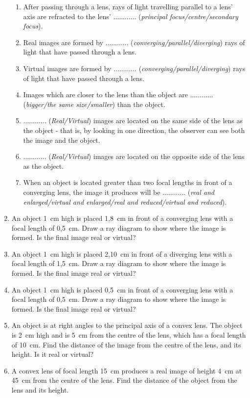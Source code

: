 \begin{eocexercises}{}
\begin{enumerate}
{\begin{enumerate}
\item After passing through a lens, rays of light travelling parallel to a lens' axis are refracted to the lens' $\ldots\ldots\ldots\ldots$ (\textit{principal focus/centre/secondary focus}).
\item Real images are formed by $\ldots\ldots\ldots\ldots$ (\textit{converging/parallel/diverging}) rays of light that have passed through a lens.
\item Virtual images are formed by $\ldots\ldots\ldots\ldots$ (\textit{converging/parallel/diverging}) rays of light that have passed through a lens.
\item Images which are closer to the lens than the object are $\ldots\ldots\ldots\ldots$ (\textit{bigger/the same size/smaller}) than the object.
\item $\ldots\ldots\ldots\ldots$ (\textit{Real/Virtual}) images are located on the same side of the lens as the object - that is, by looking in one direction, the observer can see both the image and the object.
\item $\ldots\ldots\ldots\ldots$ (\textit{Real/Virtual}) images are located on the opposite side of the lens as the object.
\item When an object is located greater than two focal lengths in front of a converging lens, the image it produces will be $\ldots\ldots\ldots\ldots$ (\textit{real and enlarged/virtual and enlarged/real and reduced/virtual and reduced}).
\end{enumerate}}
\item An object 1~cm high is placed 1,8~cm in front of a converging lens with a focal length of 0,5~cm. Draw a ray diagram to show where the image is formed. Is the final image real or virtual?
\item An object 1~cm high is placed 2,10~cm in front of a diverging lens with a focal length of 1,5~cm. Draw a ray diagram to show where the image is formed. Is the final image real or virtual?
\item An object 1~cm high is placed 0,5~cm in front of a converging lens with a focal length of 0,5~cm. Draw a ray diagram to show where the image is formed. Is the final image real or virtual?
\item An object is at right angles to the principal axis of a convex lens. The object is 2~cm high and is 5~cm from the centre of the lens, which has a focal length of 10~cm. Find the distance of the image from the centre of the lens, and its height. Is it real or virtual?
\item A convex lens of focal length 15~cm produces a real image of height 4~cm at 45~cm from the centre of the lens. Find the distance of the object from the lens and its height.

\end{enumerate}
\end{eocexercises}
